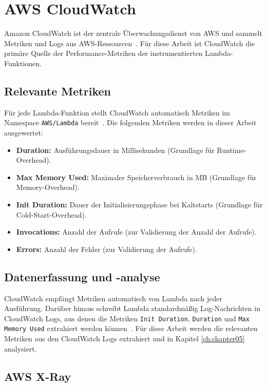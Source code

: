 \section{AWS CloudWatch}
\label{sec:cloudwatch}

Amazon CloudWatch ist der zentrale Überwachungsdienst von AWS und sammelt Metriken und Logs aus AWS-Ressourcen~\cite{AWSCloudWatchDocs}. Für diese Arbeit ist CloudWatch die primäre Quelle der Performance-Metriken der instrumentierten Lambda-Funktionen.

\subsection{Relevante Metriken}
Für jede Lambda-Funktion stellt CloudWatch automatisch Metriken im Namespace \texttt{AWS/Lambda} bereit~\cite{AWSLambdaMetrics}. Die folgenden Metriken werden in dieser Arbeit ausgewertet:
\begin{itemize}
    \item \textbf{Duration:} Ausführungsdauer in Millisekunden (Grundlage für Runtime-Overhead).
    \item \textbf{Max Memory Used:} Maximaler Speicherverbrauch in MB (Grundlage für Memory-Overhead).
    \item \textbf{Init Duration:} Dauer der Initialisierungsphase bei Kaltstarts (Grundlage für Cold-Start-Overhead).
    \item \textbf{Invocations:} Anzahl der Aufrufe (zur Validierung der Anzahl der Aufrufe).
    \item \textbf{Errors:} Anzahl der Fehler (zur Validierung der Aufrufe).
\end{itemize}

\subsection{Datenerfassung und -analyse}
CloudWatch empfängt Metriken automatisch von Lambda nach jeder Ausführung. Darüber hinaus schreibt Lambda standardmäßig Log-Nachrichten in CloudWatch Logs, aus denen die Metriken \texttt{Init Duration}, \texttt{Duration} und \texttt{Max Memory Used} extrahiert werden können~\cite{GraylogLambdaMetrics}. Für diese Arbeit werden die relevanten Metriken aus den CloudWatch Logs extrahiert und in Kapitel \ref{ch:chapter05} analysiert.

\subsection{AWS X-Ray}
\label{subsec:aws-xray}

